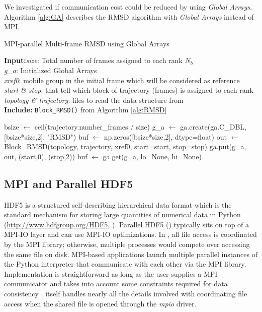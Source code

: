 We investigated if communication cost could be reduced by using \emph{Global Arrays}.
Algorithm \ref{alg:GA} describes the RMSD algorithm with \emph{Global Arrays} instead of MPI.

\begin{algorithm}[ht!]
	\scriptsize
	\caption{MPI-parallel Multi-frame RMSD using Global Arrays}
	\label{alg:GA}
	\hspace*{\algorithmicindent} \textbf{Input:}\emph{size}: Total number of frames assigned to each rank $N_{b}$\\
	\hspace*{\algorithmicindent} \emph{g\_a}: Initialized Global Arrays \\
	\hspace*{\algorithmicindent} \emph{xref0}: mobile group in the initial frame which will be considered as reference \\
	\hspace*{\algorithmicindent} \emph{start \& stop}: that tell which block of trajectory (frames) is assigned to each rank \\
	\hspace*{\algorithmicindent} \emph{topology \& trajectory}: files to read the data structure from \\
	\hspace*{\algorithmicindent}\textbf{Include:} \texttt{Block\_RMSD()} from Algorithm \ref{alg:RMSD}
	\begin{algorithmic}[1]
		
		\State bsize $\leftarrow$ ceil(trajectory.number\_frames / size)
		\State g\_a $\leftarrow$ ga.create(ga.C\_DBL, [bsize*size,2], "RMSD")
		\State buf $\leftarrow$ np.zeros([bsize*size,2], dtype=float)
		\State out $\leftarrow$ Block\_RMSD(topology, trajectory, xref0, start=start, stop=stop)
		\State ga.put(g\_a, out, (start,0), (stop,2))
		\State buf $\leftarrow$ ga.get(g\_a, lo=None, hi=None)
		\EndIf
	\end{algorithmic}
\end{algorithm}

\subsection{MPI and Parallel HDF5}
\label{sec:methods-hdf5}

HDF5 is a structured self-describing hierarchical data format which is the standard mechanism for storing large quantities of numerical data in Python (\url{http://www.hdfgroup.org/HDF5}, \cite{pythonhdf5}).
Parallel HDF5 () typically sits on top of a MPI-IO layer and can use MPI-IO optimizations. 
In , all file access is coordinated by the MPI library; otherwise, multiple processes would compete over accessing the same file on disk. 
MPI-based applications launch multiple parallel instances of the Python interpreter that communicate with each other via the MPI library. 
Implementation is straightforward as long as the user supplies a MPI communicator and takes into account some constraints required for data consistency \cite{pythonhdf5}.
 itself handles nearly all the details involved with coordinating file access when the shared file is opened through the \emph{mpio} driver.

